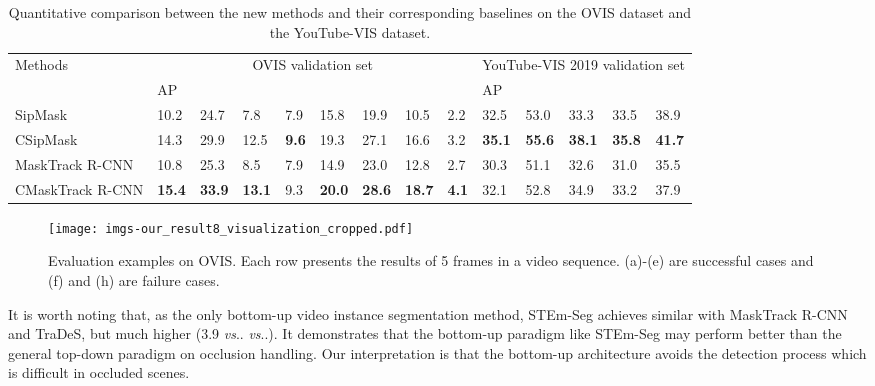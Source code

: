 \documentclass[twocolumn]{svjour3}          \smartqed  \usepackage{graphicx}
\makeatletter
\DeclareRobustCommand\onedot{\futurelet\@let@token\@onedot}
\def\@onedot{\ifx\@let@token.\else.\null\fi\xspace}
\def\vs{\emph{vs}\onedot}
\def\myTextColor{\textcolor[rgb]{0, 0, 0}}
\makeatother
\begin{document}
\begin{sloppypar}
\begin{table*}[!t]
\centering
\begin{tabular}{|l|p{0.55cm}<{\centering}p{0.48cm}<{\centering}p{0.56cm}<{\centering}p{0.47cm}<{\centering}p{0.61cm}<{\centering}|p{0.61cm}<{\centering}p{0.61cm}<{\centering}p{0.61cm}<{\centering}|p{0.48cm}<{\centering}p{0.48cm}<{\centering}p{0.48cm}<{\centering}p{0.47cm}<{\centering}p{0.61cm}<{\centering}|}
\hline
\multirow{2}{*}{Methods} & \multicolumn{8}{c|}{OVIS validation set} & \multicolumn{5}{c|}{YouTube-VIS 2019 validation set}  \\
\cline{2-9} \cline{10-14}
& AP  &   &   &   &  &   &   &   & AP  &  &   &   &  \\
\hline
\hline
SipMask~\cite{sipmask} & 10.2 & 24.7 & 7.8 & 7.9 & 15.8 & 19.9 & 10.5 & 2.2 & 32.5 & 53.0 & 33.3 & 33.5 & 38.9\\
CSipMask  & 14.3 & 29.9 & 12.5 & \textbf{9.6} & 19.3 & 27.1 & 16.6 & 3.2 &\textbf{35.1} & \textbf{55.6} &\textbf{38.1} &\textbf{35.8}  &\textbf{41.7} \\
\hline
\small{MaskTrack R-CNN~\cite{youtube_vis}} & 10.8 & 25.3 & 8.5 & 7.9 & 14.9 & 23.0 & 12.8 & 2.7 & 30.3 & 51.1 & 32.6 & 31.0 & 35.5 \\
CMaskTrack R-CNN & \textbf{15.4} & \textbf{33.9} & \textbf{13.1} & 9.3 & \textbf{20.0} &\textbf{28.6} & \textbf{18.7} & \textbf{4.1} & 32.1 & 52.8 & 34.9 & 33.2 & 37.9\\
\hline
\end{tabular}
\caption{Quantitative comparison between the new methods and their corresponding baselines on the OVIS dataset and the YouTube-VIS dataset.}
\label{tb:tfc_ablation}
\end{table*}

\begin{figure*}[t]
\centering
  \texttt{[image: imgs-our\_result8\_visualization\_cropped.pdf]}
  \caption{Evaluation examples on OVIS. Each row presents the results of 5 frames in a video sequence. (a)-(e) are successful cases and (f) and (h) are failure cases.}
\label{fig:frames_Visilation}
\end{figure*}

\myTextColor{It is worth noting that, as the only bottom-up video instance segmentation method, STEm-Seg achieves similar  with MaskTrack R-CNN and TraDeS, but much higher  (3.9 \vs 2.7 \vs 3.0). It demonstrates that the bottom-up paradigm like STEm-Seg may perform better than the general top-down paradigm on occlusion handling. Our interpretation is that the bottom-up architecture avoids the detection process which is difficult in occluded scenes.}


\end{sloppypar}
\end{document}
